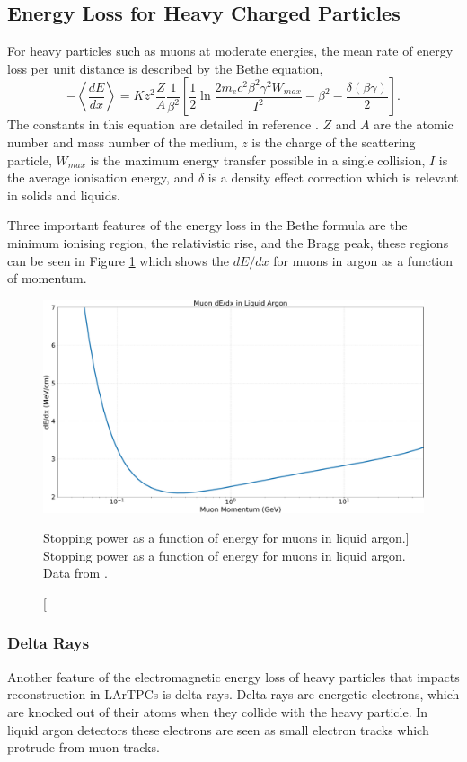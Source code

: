 \subsection{Energy Loss for Heavy Charged Particles}
For heavy particles such as muons at moderate energies, the mean rate of 
energy loss per unit distance is described by the Bethe equation,
\begin{equation}
	- \left< \frac{dE}{dx}\right> = K z^2 \frac{Z}{A} \frac{1}{\beta^2} 
	\left[ \frac{1}{2} \ln \frac{2 m_e c^2 \beta^2 \gamma^2 W_{max}}{I^2} -
	\beta^2 - \frac{\delta(\beta \gamma)}{2}\right].
	\label{eq:mu_stop}
\end{equation}
The constants in this equation are detailed in reference
\cite{PhysRevD.98.030001}. $Z$ and $A$ are the atomic number and mass number of
the medium, $z$ is the charge of the scattering particle, $W_{max}$ is the 
maximum energy transfer possible in a single collision, $I$ is the average 
ionisation energy, and $\delta$ is a density effect correction which is 
relevant in solids and liquids. 

Three important features of the energy loss in the Bethe formula are the minimum
ionising region, the relativistic rise, and the Bragg peak, these regions can be
seen in Figure \ref{fig:muon_dedx} which shows the $dE/dx$ for muons in argon 
as a function of momentum. 

\begin{figure}
	\centering
	\includegraphics[width=\textwidth]{figures/muon_dedx_argon.pdf}
	\caption
	[Stopping power as a function of energy for muons in liquid argon.]
	{ Stopping power as a function of energy for muons in liquid argon. Data from
	\cite{pdg_atomictables}.}
	\label{fig:muon_dedx}
\end{figure}

\subsubsection*{Delta Rays}
Another feature of the electromagnetic energy loss of heavy particles that
impacts reconstruction in LArTPCs is delta rays. Delta rays are energetic
electrons, which are knocked out of their atoms when they collide with the heavy
particle. In liquid argon detectors these electrons are seen as small electron 
tracks which protrude from muon tracks. 

